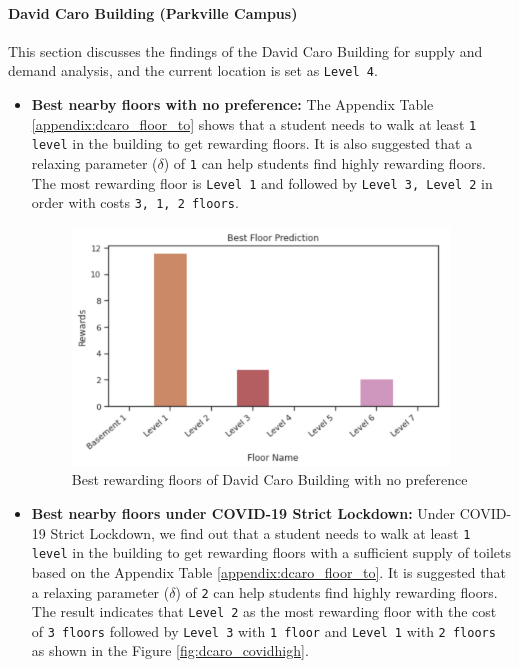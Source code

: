\paragraph{David Caro Building (Parkville Campus)}
This section discusses the findings of the David Caro Building for supply and demand analysis, and the current location is set as \texttt{Level 4}.
\begin{itemize}
    \item \textbf{Best nearby floors with no preference:}
    The Appendix Table \ref{appendix:dcaro_floor_to} shows that a student needs to walk at least \texttt{1 level} in the building to get rewarding floors. It is also suggested that a relaxing parameter ($\delta$) of \texttt{1} can help students find highly rewarding floors. The most rewarding floor is \texttt{Level 1} and followed by \texttt{Level 3, Level 2} in order with costs \texttt{3, 1, 2 floors}.
    
    \begin{figure}[H]
    \centering
    \includegraphics[width=10cm,keepaspectratio=true]{resources/images/floor_to/dcaro_no.png}
    \caption{Best rewarding floors of David Caro Building with no preference}
    \label{fig:dcaro_no}
    \end{figure}
    
    \item \textbf{Best nearby floors under COVID-19 Strict Lockdown:}
    Under COVID-19 Strict Lockdown, we find out that a student needs to walk at least \texttt{1 level} in the building to get rewarding floors with a sufficient supply of toilets based on the Appendix Table \ref{appendix:dcaro_floor_to}. It is suggested that a relaxing parameter ($\delta$) of \texttt{2} can help students find highly rewarding floors. The result indicates that \texttt{Level 2} as the most rewarding floor with the cost of \texttt{3 floors} followed by \texttt{Level 3} with \texttt{1 floor} and \texttt{Level 1} with \texttt{2 floors} as shown in the Figure \ref{fig:dcaro_covidhigh}.
    

\end{itemize}
